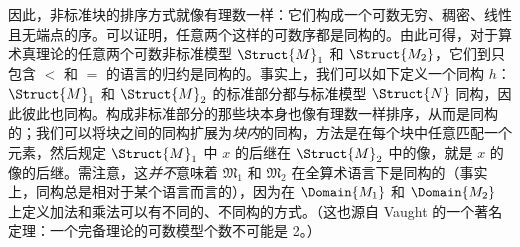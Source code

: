 \documentclass[../../../include/open-logic-section]{subfiles}
\begin{document}
\begin{explain}
因此，非标准块的排序方式就像有理数一样：它们构成一个可数无穷、稠密、线性且无端点的序。可以证明，任意两个这样的可数序都是同构的。由此可得，对于算术真理论的任意两个可数非标准模型 $\Struct{M}_1$ 和 $\Struct{M_2}$，它们到只包含 $<$ 和 $=$ 的语言的归约是同构的。事实上，我们可以如下定义一个同构 $h$：$\Struct{M}_1$ 和 $\Struct{M}_2$ 的标准部分都与标准模型 $\Struct{N}$ 同构，因此彼此也同构。构成非标准部分的那些块本身也像有理数一样排序，从而是同构的；我们可以将块之间的同构扩展为\emph{块内}的同构，方法是在每个块中任意匹配一个元素，然后规定 $\Struct{M}_1$ 中 $x$ 的后继在 $\Struct{M}_2$ 中的像，就是 $x$ 的像的后继。需注意，这\emph{并不}意味着 $\mathfrak{M}_1$ 和 $\mathfrak{M}_2$ 在全算术语言下是同构的（事实上，同构总是相对于某个语言而言的），因为在 $\Domain{M_1}$ 和 $\Domain{M_2}$ 上定义加法和乘法可以有不同的、不同构的方式。（这也源自 Vaught 的一个著名定理：一个完备理论的可数模型个数不可能是 2。）
\end{explain}
\end{document}
